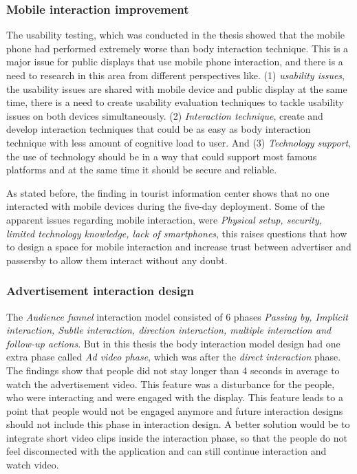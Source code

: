 \subsubsection{Mobile interaction improvement}
The usability testing, which was conducted in the thesis showed that the mobile phone had performed extremely worse than body interaction technique. This is a major issue for public displays that use mobile phone interaction, and there is a need to research in this area from different perspectives like. (1) \emph{usability issues}, the usability issues are shared with mobile device and public display at the same time, there is a need to create usability evaluation techniques to tackle usability issues on both devices simultaneously. (2) \emph{Interaction technique}, create and develop interaction techniques that could be as easy as body interaction technique with less amount of cognitive load to user. And (3) \emph{Technology support}, the use of technology should be in a way that could support most famous platforms and at the same time it should be secure and reliable. 

As stated before, the finding in tourist information center shows that no one interacted with mobile devices during the five-day deployment. Some of the apparent issues regarding mobile interaction, were \emph{Physical setup, security, limited technology knowledge, lack of smartphones}, this raises questions that how to design a space for mobile interaction and increase trust between advertiser and passersby to allow them interact without any doubt. 


\subsubsection{Advertisement interaction design}
The \emph{Audience funnel}\cite{AudienceFunnel} interaction model consisted of 6 phases \emph{Passing by, Implicit interaction, Subtle interaction, direction interaction, multiple interaction and follow-up actions}. But in this thesis the body interaction model design had one extra phase called \emph{Ad video phase}, which was after the \emph{direct interaction} phase. The findings show that people did not stay longer than 4 seconds in average to watch the advertisement video. This feature was a disturbance for the people, who were interacting and were engaged with the display. This feature leads to a point that people would not be engaged anymore and future interaction designs should not include this phase in interaction design. A better solution would be to integrate short video clips inside the interaction phase, so that the people do not feel disconnected with the application and can still continue interaction and watch video.



